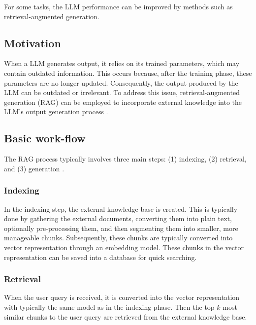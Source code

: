 For some tasks, the LLM performance can be improved by methods such as retrieval-augmented generation.


\subsection{Motivation}

When a LLM generates output, it relies on its trained parameters, which may contain outdated information. This occurs because, after the training phase, these parameters are no longer updated. Consequently, the output produced by the LLM can be outdated or irrelevant. To address this issue, retrieval-augmented generation (RAG) can be employed to incorporate external knowledge into the LLM's output generation process \cite{Gao2023}.



\subsection{Basic work-flow}

The RAG process typically involves three main steps: (1) indexing, (2) retrieval, and (3) generation \cite{Gao2023}.


\subsubsection{Indexing}

In the indexing step, the external knowledge base is created. This is typically done by gathering the external documents, converting them into plain text, optionally pre-processing them, and then segmenting them into smaller, more manageable chunks. Subsequently, these chunks are typically converted into vector representation through an embedding model. These chunks in the vector representation can be saved into a database for quick searching.


\subsubsection{Retrieval}

When the user query is received, it is converted into the vector representation with typically the same model as in the indexing phase. Then the top $k$ most similar chunks to the user query are retrieved from the external knowledge base.


